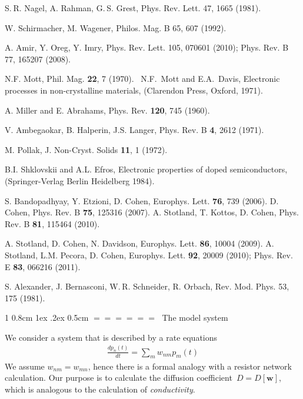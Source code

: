\documentclass[onecolumn,fleqn,notitlepage,secnumarabic]{revtex4}
\makeatletter
\newcommand{\beq}{\begin{eqnarray}}
\newcommand{\eeq}{\end{eqnarray}}
\def\section{%
  \@startsection
    {section}%
    {1}%
    {\z@}%
    {0.8cm \@plus1ex \@minus .2ex}%
    {0.5cm}%
    {\Large\bf $=\!=\!=\!=\!=\!=\;$}%
}%
\makeatother
\begin{document}
\begin{thebibliography}{99}



S. R. Nagel, A. Rahman, G. S. Grest, 
Phys. Rev. Lett. 47, 1665 (1981).

W. Schirmacher, M. Wagener, 
Philos. Mag. B 65, 607 (1992).


A. Amir, Y. Oreg, Y. Imry,
Phys. Rev. Lett. 105, 070601 (2010); 
%
Phys. Rev. B 77, 165207 (2008).



N.F. Mott, Phil. Mag. {\bf 22}, 7 (1970). 
\ N.F.~Mott and E.A.~Davis, 
Electronic processes in non-crystalline materials, 
(Clarendon Press, Oxford, 1971). 

A. Miller and E. Abrahams, Phys. Rev. {\bf 120}, 745 (1960).

V. Ambegaokar, B. Halperin, J.S. Langer, 
Phys. Rev. B {\bf 4}, 2612 (1971). 

M. Pollak, J. Non-Cryst. Solids {\bf 11}, 1 (1972).

B.I. Shklovskii and A.L. Efros, 
Electronic properties of doped semiconductors,
(Springer-Verlag Berlin Heidelberg 1984).



%
S. Bandopadhyay, Y. Etzioni, D. Cohen,
Europhys. Lett. {\bf 76}, 739 (2006).
%
D. Cohen,
Phys. Rev. B {\bf 75}, 125316 (2007).
%
A. Stotland, T. Kottos, D. Cohen, 
Phys. Rev. B {\bf 81}, 115464 (2010). 


%
A. Stotland, D. Cohen, N. Davidson, 
Europhys. Lett. {\bf 86}, 10004 (2009).
%
A. Stotland, L.M. Pecora, D. Cohen, 
Europhys. Lett. {\bf 92}, 20009 (2010);
Phys. Rev. E {\bf 83}, 066216 (2011).


S. Alexander, J. Bernasconi, W. R. Schneider, R. Orbach, 
Rev. Mod. Phys. 53, 175 (1981).


\end{thebibliography}



\section{The model system}


We consider a system that is described by a rate equations 
%
\beq
\frac{dp_n(t)}{dt} = \sum_m w_{nm} p_m(t)
\eeq
%
We assume $w_{nm}=w_{mn}$, hence there is a formal analogy 
with a resistor network calculation. Our purpose is to calculate 
the diffusion coefficient~$D=D[\bm{w}]$, which is analogous to the 
calculation of {\em conductivity}.
\end{document}
